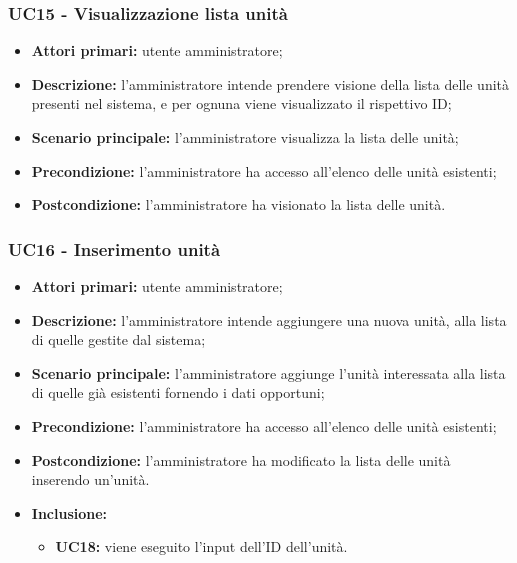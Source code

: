 \subsubsection{UC15 - Visualizzazione lista unità}
\begin{itemize}
	\item \textbf{Attori primari:} utente amministratore;
	\item \textbf{Descrizione:} l'amministratore intende prendere visione della lista delle unità presenti nel sistema, e per ognuna viene visualizzato il rispettivo ID;
	\item \textbf{Scenario principale:} l'amministratore visualizza la lista delle unità;
	\item \textbf{Precondizione:} l'amministratore ha accesso all'elenco delle unità esistenti;
	\item \textbf{Postcondizione:} l'amministratore ha visionato la lista delle unità.
\end{itemize}


\subsubsection{UC16 - Inserimento unità}
	\begin{itemize}
		\item \textbf{Attori primari:} utente amministratore;
		\item \textbf{Descrizione:} l'amministratore intende aggiungere una nuova unità, alla lista di quelle gestite dal sistema;
		\item \textbf{Scenario principale:} l'amministratore aggiunge l'unità interessata alla lista di quelle già esistenti fornendo i dati opportuni;
		\item \textbf{Precondizione:} l'amministratore ha accesso all'elenco delle unità esistenti;
		\item \textbf{Postcondizione:} l'amministratore ha modificato la lista delle unità inserendo un'unità.
		\item \textbf{Inclusione:} 
		\begin{itemize}
			\item \textbf{UC18:} viene eseguito l'input dell'ID dell'unità.
		\end{itemize}
	\end{itemize}

